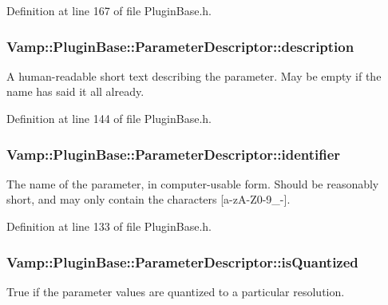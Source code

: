 Definition at line 167 of file Plugin\+Base.\+h.

\subsubsection[{\texorpdfstring{description}{description}}]{ Vamp\+::\+Plugin\+Base\+::\+Parameter\+Descriptor\+::description}\hypertarget{struct_vamp_1_1_plugin_base_1_1_parameter_descriptor_a780ddad41e433d85c82f9ea4d959cbaf}{}\label{struct_vamp_1_1_plugin_base_1_1_parameter_descriptor_a780ddad41e433d85c82f9ea4d959cbaf}
A human-\/readable short text describing the parameter. May be empty if the name has said it all already. 

Definition at line 144 of file Plugin\+Base.\+h.

\subsubsection[{\texorpdfstring{identifier}{identifier}}]{ Vamp\+::\+Plugin\+Base\+::\+Parameter\+Descriptor\+::identifier}\hypertarget{struct_vamp_1_1_plugin_base_1_1_parameter_descriptor_a116fd9f0dc94c2bc4bbc60b5443c598c}{}\label{struct_vamp_1_1_plugin_base_1_1_parameter_descriptor_a116fd9f0dc94c2bc4bbc60b5443c598c}
The name of the parameter, in computer-\/usable form. Should be reasonably short, and may only contain the characters \mbox{[}a-\/z\+A-\/\+Z0-\/9\+\_\+-\/\mbox{]}. 

Definition at line 133 of file Plugin\+Base.\+h.

\subsubsection[{\texorpdfstring{is\+Quantized}{isQuantized}}]{ Vamp\+::\+Plugin\+Base\+::\+Parameter\+Descriptor\+::is\+Quantized}\hypertarget{struct_vamp_1_1_plugin_base_1_1_parameter_descriptor_a7c556d58d552f737ee5a34efdf7f9425}{}\label{struct_vamp_1_1_plugin_base_1_1_parameter_descriptor_a7c556d58d552f737ee5a34efdf7f9425}
True if the parameter values are quantized to a particular resolution. 

